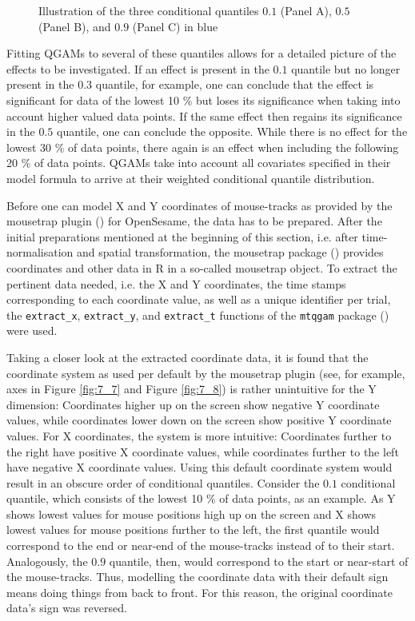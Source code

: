 \begin{figure}
    \centering
    
    \caption{Illustration of the three conditional quantiles $0.1$ (Panel A), $0.5$ (Panel B), and $0.9$ (Panel C) in blue}
    \label{fig:7_9}
\end{figure}

Fitting QGAMs to several of these quantiles allows for a detailed picture of the effects to be investigated. If an effect is present in the $0.1$ quantile but no longer present in the $0.3$ quantile, for example, one can conclude that the effect is significant for data of the lowest 10 \% but loses its significance when taking into account higher valued data points. If the same effect then regains its significance in the $0.5$ quantile, one can conclude the opposite. While there is no effect for the lowest 30 \% of data points, there again is an effect when including the following 20 \% of data points. QGAMs take into account all covariates specified in their model formula to arrive at their weighted conditional quantile distribution. 

Before one can model X and Y coordinates of mouse-tracks as provided by the mousetrap plugin (\cite{Kieslich2017}) for OpenSesame, the data has to be prepared. After the initial preparations mentioned at the beginning of this section, i.e. after time-normalisation and spatial transformation, the mousetrap package (\cite{Kieslich2019}) provides coordinates and other data in R in a so-called mousetrap object. To extract the pertinent data needed, i.e. the X and Y coordinates, the time stamps corresponding to each coordinate value, as well as a unique identifier per trial, the \texttt{extract\_x}, \texttt{extract\_y}, and \texttt{extract\_t} functions of the \texttt{mtqgam} package (\cite{Schmitz2021mtqgam}) were used. 

Taking a closer look at the extracted coordinate data, it is found that the coordinate system as used per default by the mousetrap plugin (see, for example, axes in Figure \ref{fig:7_7} and Figure \ref{fig:7_8}) is rather unintuitive for the Y dimension: Coordinates higher up on the screen show negative Y coordinate values, while coordinates lower down on the screen show positive Y coordinate values. For X coordinates, the system is more intuitive: Coordinates further to the right have positive X coordinate values, while coordinates further to the left have negative X coordinate values. Using this default coordinate system would result in an obscure order of conditional quantiles. Consider the $0.1$ conditional quantile, which consists of the lowest 10 \% of data points, as an example. As Y shows lowest values for mouse positions high up on the screen and X shows lowest values for mouse positions further to the left, the first quantile would correspond to the end or near-end of the mouse-tracks instead of to their start. Analogously, the $0.9$ quantile, then, would correspond to the start or near-start of the mouse-tracks. Thus, modelling the coordinate data with their default sign means doing things from back to front. For this reason, the original coordinate data’s sign was reversed.

